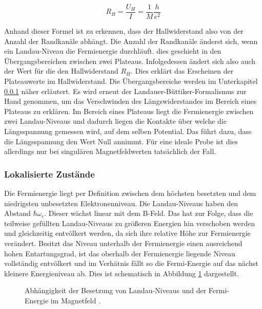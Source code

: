 \begin{equation}
R_H=\frac{U_H}{I}=\frac{1}{M}\frac{h}{e^2}
\label{eq:U_Hall_simpel}
\end{equation}

Anhand dieser Formel ist zu erkennen, dass der Hallwiderstand also von der Anzahl der Randkanäle abhängt. Die Anzahl der Randkanäle änderst sich, wenn ein Landau-Niveau die Fermienergie durchläuft. dies geschieht in den Übergangsbereichen zwischen zwei Plateaus. Infolgedessen ändert sich also auch der Wert für die den Hallwiderstand $R_H$. Dies erklärt das Erscheinen der Plateauwerte im Hallwiderstand. Die Übergangsbereiche werden im Unterkapitel \ref{sec:lokalisierte Zust} näher erläutert. 
Es wird erneut der Landauer-Büttiker-Formalismus zur Hand genommen, um das Verschwinden des Längswiderstandes im Bereich eines Plateaus zu erklären. Im Bereich eines Plateaus liegt die Fermienergie zwischen zwei Landau-Niveaus und dadurch liegen die Kontakte über welche die Längsspannung gemessen wird, auf dem selben Potential. Das führt dazu, dass die Längsspannung den Wert Null annimmt. Für eine ideale Probe ist dies allerdings nur bei singulären Magnetfeldwerten tatsächlich der Fall.


\subsubsection{Lokalisierte Zustände}
\label{sec:lokalisierte Zust}

Die Fermienergie liegt per Definition zwischen dem höchsten besetzten und dem niedrigsten unbesetzten Elektronenniveau. Die Landau-Niveaus haben den Abstand $\hbar\omega_c$. Dieser wächst linear mit dem B-Feld. Das hat zur Folge, dass die teilweise gefüllten Landau-Niveaus zu größeren Energien hin verschoben werden und gleichzeitig entvölkert werden, da sich ihre relative Höhe zur Fermienergie verändert. Besitzt das Niveau unterhalb der Fermienergie einen ausreichend hohen Entartungsgrad, ist das oberhalb der Fermienergie liegende Niveau vollständig entvölkert und im Verhätnis fällt so die Fermi-Energie auf das nächst kleinere Energieniveau ab. Dies ist schematisch in Abbildung \ref{fig:Lokalisierte_Zust_Anleitungsheft} dargestellt.

\begin{figure}[h]
	\centering
	\caption[Fermi-Energie lokalisierter Zustände]{
		Abhängigkeit der Besetzung von Landau-Niveaus und der Fermi-Energie im Magnetfeld \cite{anleitung}.
	}
	\label{fig:Lokalisierte_Zust_Anleitungsheft}
\end{figure}

